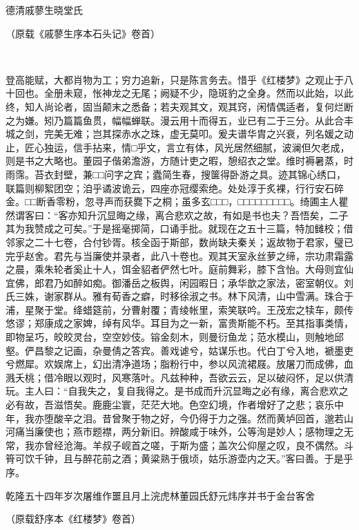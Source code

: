 \begin{flushright}
	德清戚蓼生晓堂氏　　

{（原载《戚蓼生序本石头记》卷首）}　
\end{flushright}　

{}

登高能赋，大都肖物为工；穷力追新，只是陈言务去。惜乎《红楼梦》之观止于八十回也。全册未窥，怅神龙之无尾；阙疑不少，隐斑豹之全身。然而以此始，以此终，知人尚论者，固当颠末之悉备；若夫观其文，观其窍，闲情偶适者，复何烂断之为嫌。矧乃篇篇鱼贯，幅幅蝉联。漫云用十而得五，业已有二于三分。从此合丰城之剑，完美无难；岂其探赤水之珠，虚无莫叩。爰夫谱华胄之兴衰，列名媛之动止，匠心独运，信手拈来，情□乎文，言立有体，风光居然细腻，波澜但欠老成，则是书之大略也。董园子偕弟澹游，方随计吏之暇，憩绍衣之堂。维时褥暑蒸，时雨霈。苔衣封壁，兼□□问字之宾；蠹简生春，搜箧得卧游之具。迹其锦心绣口，联篇则柳絮团空；洎乎谲波诡云，四座亦冠缨索绝。处处淳于炙裸，行行安石碎金。□□断香零粉，忽寻声而获爨下之桐；虽多玄□□□，□□□□□□□□□。绮圃主人瞿然谓客曰：``客亦知升沉显晦之缘，离合悲欢之故，有如是书也夫？吾悟矣，二子其为我赞成之可矣。''于是摇毫掷简，口诵手批。就现在之五十三篇，特加雠校；借邻家之二十七卷，合付钞胥。核全函于斯部，数尚缺夫秦关；返故物于君家，璧已完乎赵舍。{君先与当廉使并录者，此八十卷也。}观其天室永丝萝之缔，宗功肃霜露之晨，乘朱轮者奚止十人，饵金貂者俨然七叶。庭前舞彩，膝下含怡。大母则宜仙宜佛，郎君乃如醉如痴。御潘岳之板舆，闲园暇日；承华歆之家法，密室朝仪。刘氏三姝，谢家群从。雅有荀香之癖，时移徐淑之书。林下风清，山中雪满。珠合于浦，星聚于堂。绛蜡筵前，分曹射覆；青绫帐里，索笑联吟。王茂宏之犊车，颇传悠谬；郑康成之家婢，绰有风华。耳目为之一新，富贵斯能不朽。至其指事类情，即物呈巧，皎皎灵台，空空妙伎。镕金刻木，则曼衍鱼龙；范水模山，则触地邱壑。俨昌黎之记画，杂曼倩之答宾。善戏谑兮，姑谋乐也。代白丁兮入地，褫墨吏兮燃犀。欢娱席上，幻出清净道场；脂粉行中，参以风流裙屐。放屠刀而成佛，血溅夭桃；借冷眼以观时，风寒落叶。凡兹种种，吾欲云云，足以破闷怀，足以供清玩。主人曰：``自我失之，复自我得之。是书成而升沉显晦之必有缘，离合悲欢之必有故，吾滋悟矣。鹿鹿尘寰，茫茫大地。色空幻境，作者增好了之悲；哀乐中年，我亦堕酸辛之泪。昔曾聚于物之好，今仍得于力之强。然而黄垆回首，邈若山河{痛当廉使也}；燕市题襟，两分新旧。辨酸咸于味外，公等洵是妙人；感物理之无常，我亦曾经沧海。羊叔子岘首之嗟，于斯为盛；盖次公仰屋之叹，良不偶然。斗筲可饮千钟，且与醉花前之酒；黄粱熟于俄顷，姑乐游壶内之天。''客曰善。于是乎序。

\begin{flushright}
	乾隆五十四年岁次屠维作噩且月上浣虎林董园氏舒元炜序并书于金台客舍　　

{（原载舒序本《红楼梦》卷首）}　　
\end{flushright}

